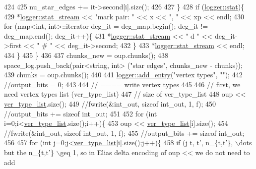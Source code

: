 \begin{DoxyCode}
424 
425       nu\_star\_edges += it->second[i].size();
426       
427     \}
428     \textcolor{keywordflow}{if} (\hyperlink{classlogger_a26812b5ba03f130e8dae3446d5fc032f}{logger::stat})\{
429       *\hyperlink{classlogger_a7db37821f875f2ba3540980b355779f5}{logger::stat\_stream} << \textcolor{stringliteral}{"mark pair: "} <<  x << \textcolor{stringliteral}{", "} << xp << endl;
430       \textcolor{keywordflow}{for} (map<int, int>::iterator deg\_it = deg\_map.begin(); deg\_it != deg\_map.end(); deg\_it++)\{
431         *\hyperlink{classlogger_a7db37821f875f2ba3540980b355779f5}{logger::stat\_stream} << \textcolor{stringliteral}{" d "} << deg\_it->first << \textcolor{stringliteral}{" # "} << deg\_it->second;
432       \}
433       *\hyperlink{classlogger_a7db37821f875f2ba3540980b355779f5}{logger::stat\_stream} << endl;
434     \}
435   \}
436   
437   chunks\_new = oup.chunks();
438   space\_log.push\_back(pair<string, int> (\textcolor{stringliteral}{"star edges"}, chunks\_new - chunks));
439   chunks = oup.chunks();
440 
441   \hyperlink{classlogger_a710163deb17bc81f70d53d285b8ac9ac}{logger::add\_entry}(\textcolor{stringliteral}{"vertex types"}, \textcolor{stringliteral}{""});
442   \textcolor{comment}{//output\_bits = 0;}
443   
444   \textcolor{comment}{// ==== write vertex types}
445 
446   \textcolor{comment}{// first, we need vertex types list (ver\_type\_list)}
447   \textcolor{comment}{// size of ver\_type\_list}
448   oup <<  \hyperlink{classmarked__graph__compressed_af2e3e55223d436628a02758dfae88493}{ver\_type\_list}.size();
449   \textcolor{comment}{//fwrite(&int\_out, sizeof int\_out, 1, f);}
450   \textcolor{comment}{//output\_bits += sizeof int\_out;}
451 
452   \textcolor{keywordflow}{for} (\textcolor{keywordtype}{int} i=0;i<\hyperlink{classmarked__graph__compressed_af2e3e55223d436628a02758dfae88493}{ver\_type\_list}.size();i++)\{
453     oup << \hyperlink{classmarked__graph__compressed_af2e3e55223d436628a02758dfae88493}{ver\_type\_list}[i].size();
454     \textcolor{comment}{//fwrite(&int\_out, sizeof int\_out, 1, f);}
455     \textcolor{comment}{//output\_bits += sizeof int\_out;}
456 
457     \textcolor{keywordflow}{for} (\textcolor{keywordtype}{int} j=0;j<\hyperlink{classmarked__graph__compressed_af2e3e55223d436628a02758dfae88493}{ver\_type\_list}[i].size();j++)\{
458       \textcolor{keywordflow}{if} (j%
       t, t', n\_\{t,t'\}, \(\backslash\)dots but the n\_\{t,t'\} \(\backslash\)geq 1, so in Elias delta encoding of oup << we do not need to add

\end{DoxyCode}

